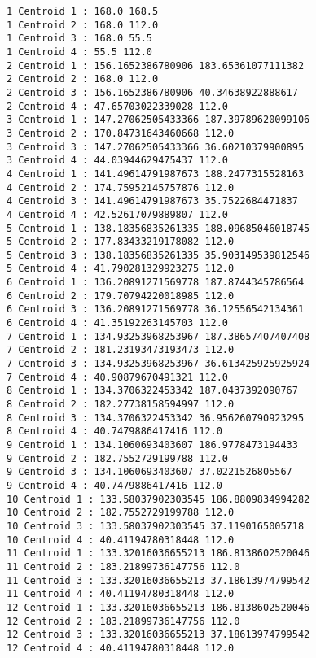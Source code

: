 \documentclass[11pt]{article}
\begin{document}
    \begin{Verbatim}[commandchars=\\\{\}]
1 Centroid 1 : 168.0 168.5
1 Centroid 2 : 168.0 112.0
1 Centroid 3 : 168.0 55.5
1 Centroid 4 : 55.5 112.0
2 Centroid 1 : 156.1652386780906 183.65361077111382
2 Centroid 2 : 168.0 112.0
2 Centroid 3 : 156.1652386780906 40.34638922888617
2 Centroid 4 : 47.65703022339028 112.0
3 Centroid 1 : 147.27062505433366 187.39789620099106
3 Centroid 2 : 170.84731643460668 112.0
3 Centroid 3 : 147.27062505433366 36.60210379900895
3 Centroid 4 : 44.03944629475437 112.0
4 Centroid 1 : 141.49614791987673 188.2477315528163
4 Centroid 2 : 174.75952145757876 112.0
4 Centroid 3 : 141.49614791987673 35.7522684471837
4 Centroid 4 : 42.52617079889807 112.0
5 Centroid 1 : 138.18356835261335 188.09685046018745
5 Centroid 2 : 177.83433219178082 112.0
5 Centroid 3 : 138.18356835261335 35.903149539812546
5 Centroid 4 : 41.790281329923275 112.0
6 Centroid 1 : 136.20891271569778 187.8744345786564
6 Centroid 2 : 179.70794220018985 112.0
6 Centroid 3 : 136.20891271569778 36.12556542134361
6 Centroid 4 : 41.35192263145703 112.0
7 Centroid 1 : 134.93253968253967 187.38657407407408
7 Centroid 2 : 181.23193473193473 112.0
7 Centroid 3 : 134.93253968253967 36.613425925925924
7 Centroid 4 : 40.90879670491321 112.0
8 Centroid 1 : 134.3706322453342 187.0437392090767
8 Centroid 2 : 182.27738158594997 112.0
8 Centroid 3 : 134.3706322453342 36.956260790923295
8 Centroid 4 : 40.7479886417416 112.0
9 Centroid 1 : 134.1060693403607 186.9778473194433
9 Centroid 2 : 182.7552729199788 112.0
9 Centroid 3 : 134.1060693403607 37.0221526805567
9 Centroid 4 : 40.7479886417416 112.0
10 Centroid 1 : 133.58037902303545 186.8809834994282
10 Centroid 2 : 182.7552729199788 112.0
10 Centroid 3 : 133.58037902303545 37.1190165005718
10 Centroid 4 : 40.41194780318448 112.0
11 Centroid 1 : 133.32016036655213 186.8138602520046
11 Centroid 2 : 183.21899736147756 112.0
11 Centroid 3 : 133.32016036655213 37.18613974799542
11 Centroid 4 : 40.41194780318448 112.0
12 Centroid 1 : 133.32016036655213 186.8138602520046
12 Centroid 2 : 183.21899736147756 112.0
12 Centroid 3 : 133.32016036655213 37.18613974799542
12 Centroid 4 : 40.41194780318448 112.0

    \end{Verbatim}

    \begin{center}
    \end{center}
    { \hspace*{\fill} \\}
    

    
    
    
    
\end{document}
